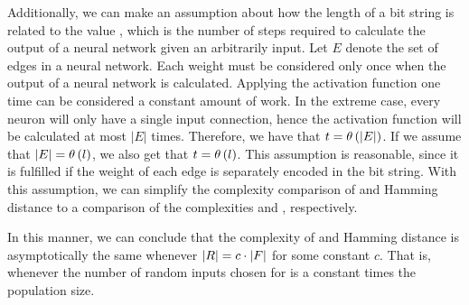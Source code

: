 Additionally, we can make an assumption about how the length of a bit string \bitstringl{} is related to the value \timet, which is the number of steps required to calculate the output of a neural network given an arbitrarily input. Let $E$ denote the set of edges in a neural network. Each weight must be considered only once when the output of a neural network is calculated. Applying the activation function one time can be considered a constant amount of work. In the extreme case, every neuron will only have a single input connection, hence the activation function will be calculated at most $|E|$ times. Therefore, we have that $t = \theta\left(\lvert E\rvert\right)$. If we assume that $\lvert E\rvert = \theta\left(l\right)$, we also get that $t = \theta\left(l\right)$. This assumption is reasonable, since it is fulfilled if the weight of each edge is separately encoded in the bit string. With this assumption, we can simplify the complexity comparison of \dia{} and Hamming distance to a comparison of the complexities \bigO{\ransetl} and \bigO{\indsetl}, respectively.

In this manner, we can conclude that the complexity of \dia{} and Hamming distance is asymptotically the same whenever $\lvert R\rvert = c \cdot \lvert F\rvert$ for some constant $c$. That is, whenever the number of random inputs chosen for \dia{} is a constant times the population size.
